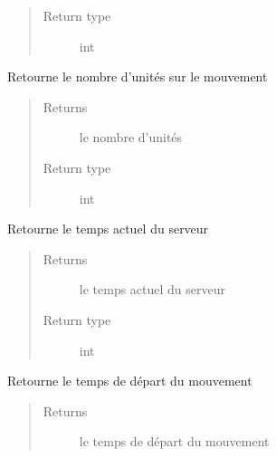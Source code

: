 \documentclass[letterpaper,10pt,english]{sphinxmanual}
\begin{document}
\begin{fulllineitems}
\begin{fulllineitems}
\begin{quote}
\begin{description}
\item[{Return type}] \leavevmode
int

\end{description}\end{quote}

\end{fulllineitems}


\begin{fulllineitems}
\label{index:Mouvement.Mouvement.getNbUnites}
Retourne le nombre d'unités sur le mouvement
\begin{quote}\begin{description}
\item[{Returns}] \leavevmode
le nombre d'unités

\item[{Return type}] \leavevmode
int

\end{description}\end{quote}

\end{fulllineitems}


\begin{fulllineitems}
\label{index:Mouvement.Mouvement.getTempsActuel}
Retourne le temps actuel du serveur
\begin{quote}\begin{description}
\item[{Returns}] \leavevmode
le temps actuel du serveur

\item[{Return type}] \leavevmode
int

\end{description}\end{quote}

\end{fulllineitems}


\begin{fulllineitems}
\label{index:Mouvement.Mouvement.getTempsDepart}
Retourne le temps de départ du mouvement
\begin{quote}\begin{description}
\item[{Returns}] \leavevmode
le temps de départ du mouvement


\end{description}
\end{quote}
\end{fulllineitems}
\end{fulllineitems}
\end{document}
